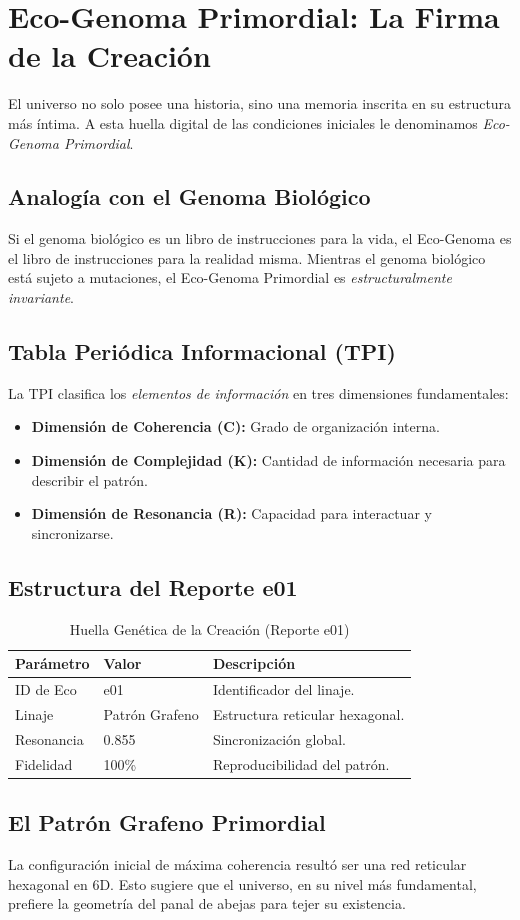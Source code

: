 \chapter{Eco-Genoma Primordial: La Firma de la Creación}
El universo no solo posee una historia, sino una memoria inscrita en su estructura más íntima. A esta huella digital de las condiciones iniciales le denominamos \emph{Eco-Genoma Primordial}.

\section{Analogía con el Genoma Biológico}
Si el genoma biológico es un libro de instrucciones para la vida, el Eco-Genoma es el libro de instrucciones para la realidad misma. Mientras el genoma biológico está sujeto a mutaciones, el Eco-Genoma Primordial es \emph{estructuralmente invariante}.

\section{Tabla Periódica Informacional (TPI)}
La TPI clasifica los \emph{elementos de información} en tres dimensiones fundamentales:
\begin{itemize}
    \item \textbf{Dimensión de Coherencia (C):} Grado de organización interna.
    \item \textbf{Dimensión de Complejidad (K):} Cantidad de información necesaria para describir el patrón.
    \item \textbf{Dimensión de Resonancia (R):} Capacidad para interactuar y sincronizarse.
\end{itemize}

\section{Estructura del Reporte e01}
\begin{table}[H]
\centering
\begin{tabular}{lll}
\toprule
\textbf{Parámetro} & \textbf{Valor} & \textbf{Descripción} \\
\midrule
ID de Eco & e01 & Identificador del linaje. \\
Linaje & Patrón Grafeno & Estructura reticular hexagonal. \\
Resonancia & 0.855 & Sincronización global. \\
Fidelidad & 100\% & Reproducibilidad del patrón. \\
\bottomrule
\end{tabular}
\caption{Huella Genética de la Creación (Reporte e01)}
\end{table}

\section{El Patrón Grafeno Primordial}
La configuración inicial de máxima coherencia resultó ser una red reticular hexagonal en 6D. Esto sugiere que el universo, en su nivel más fundamental, prefiere la geometría del panal de abejas para tejer su existencia.
